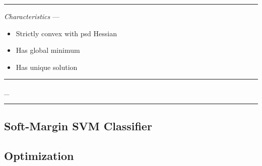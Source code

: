 {\color{lightgray}\hrule height 0.001mm}

\emph{Characteristics} --- 
\begin{itemize}
    \item Strictly convex with psd Hessian
    \item Has global minimum
    \item Has unique solution
\end{itemize}

{\color{black}\hrule height 0.001mm}
_
{\color{black}\hrule height 0.001mm}

\subsection*{Soft-Margin SVM Classifier}
\subsection*{Optimization}

